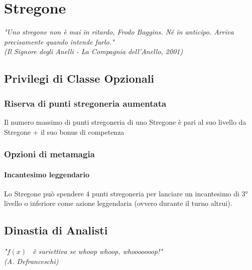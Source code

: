 \chapter{Stregone}

\begin{DndReadAloud}
    \it
    "Uno stregone non è mai in ritardo, Frodo Baggins. Né in anticipo. Arriva precisamente quando intende farlo." \\ (Il Signore degli Anelli - La Compagnia dell'Anello, 2001)
  \end{DndReadAloud}

\section{Privilegi di Classe Opzionali}

\subsection{Riserva di punti stregoneria aumentata}

Il numero massimo di punti stregoneria di uno Stregone è pari al suo livello da Stregone + il suo bonus di competenza

\subsection{Opzioni di metamagia}

\subsubsection*{Incantesimo leggendario}

Lo Stregone può spendere 4 punti stregoneria per lanciare un incantesimo di 3° livello o inferiore come azione leggendaria (ovvero durante il turno altrui).

\section{Dinastia di Analisti}

\begin{DndReadAloud}
  \it
  "\begin{math}f(x)\end{math} \ è suriettiva se whoop whoop, whooooooop!" \\ (A. Defranceschi)
\end{DndReadAloud}

